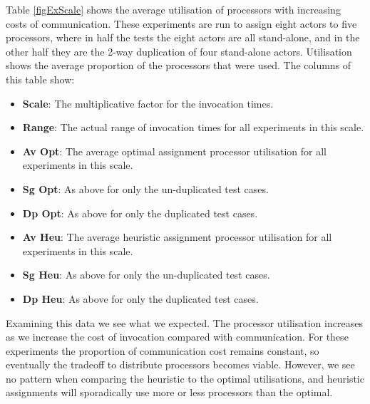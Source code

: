 Table \ref{figExScale} shows the average utilisation of processors with increasing costs of communication.
These experiments are run to assign eight actors to five processors, where in half the tests the eight actors are all stand-alone, and in the other half they are the 2-way duplication of four stand-alone actors.
Utilisation shows the average proportion of the processors that were used.
The columns of this table show:
\begin{itemize}
	\item {\bf Scale}: The multiplicative factor for the invocation times.
	\item {\bf Range}: The actual range of invocation times for all experiments in this scale.
	\item {\bf Av Opt}: The average optimal assignment processor utilisation for all experiments in this scale.
	\item {\bf Sg Opt}: As above for only the un-duplicated test cases.
	\item {\bf Dp Opt}: As above for only the duplicated test cases.
	\item {\bf Av Heu}: The average heuristic assignment processor utilisation for all experiments in this scale.
	\item {\bf Sg Heu}: As above for only the un-duplicated test cases.
	\item {\bf Dp Heu}: As above for only the duplicated test cases.
\end{itemize}

Examining this data we see what we expected.
The processor utilisation increases as we increase the cost of invocation compared with communication.
For these experiments the proportion of communication cost remains constant, so eventually the tradeoff to distribute processors becomes viable.
However, we see no pattern when comparing the heuristic to the optimal utilisations, and heuristic assignments will sporadically use more or less processors than the optimal.


